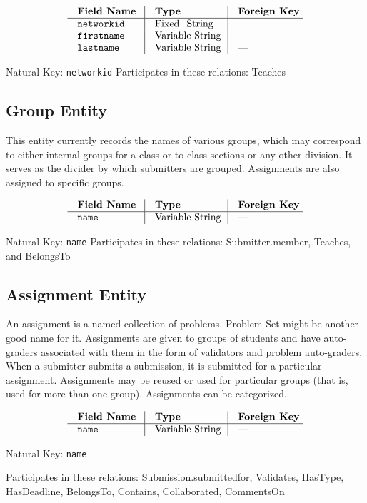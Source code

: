 $$\vbox{
	\offinterlineskip
	\halign{
		\strut \quad {\tt #}	& \vrule\quad #	& \vrule\quad # \cr
		{\bf Field Name}	& {\bf Type}	& {\bf Foreign Key}\cr
		\noalign{\hrule}		
		networkid	& Fixed String	& --- \cr
		firstname	& Variable String	& --- \cr
		lastname	& Variable String	& --- \cr
	}
}$$

{\noindent\flushleft
Natural Key: {\tt networkid}
Participates in these relations: Teaches}

\subsection{Group Entity}
This entity currently records the names of various groups,
which may correspond to either internal groups for a class
or to class sections or any other division.
It serves as the divider by which submitters are grouped.
Assignments are also assigned to specific groups.

$$\vbox{
	\offinterlineskip
	\halign{
		\strut \quad {\tt #}	& \vrule\quad #	& \vrule\quad # \cr
		{\bf Field Name}	& {\bf Type}	& {\bf Foreign Key}\cr
		\noalign{\hrule}		
		name	& Variable String	& --- \cr
	}
}$$

{\noindent\flushleft
Natural Key: {\tt name}
Participates in these relations: Submitter.member, Teaches, and BelongsTo}

\subsection{Assignment Entity}
An assignment is a named collection of problems.
Problem Set might be another good name for it.
Assignments are given to groups of students and have auto-graders
associated with them in the form of validators and problem auto-graders.
When a submitter submits a submission, 
it is submitted for a particular assignment.
Assignments may be reused or used for particular groups
(that is, used for more than one group). 
Assignments can be categorized.

$$\vbox{
	\offinterlineskip
	\halign{
		\strut \quad {\tt #}	& \vrule\quad #	& \vrule\quad # \cr
		{\bf Field Name}	& {\bf Type}	& {\bf Foreign Key}\cr
		\noalign{\hrule}		
		name	& Variable String	& --- \cr
	}
}$$

{\noindent
Natural Key: {\tt name}\par\noindent
Participates in these relations: Submission.submittedfor, Validates,
HasType, HasDeadline, BelongsTo, Contains, Collaborated, CommentsOn\par}

